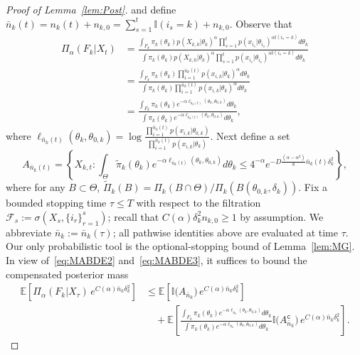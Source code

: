 \documentclass[10pt,a4paper]{amsart}
\def\bbE{\mathbb E}
\def\ind{\mathbb{I}}
\begin{document}
\begin{proof}[Proof of Lemma~\ref{lem:Post}]
 and define $\bar n_k(t)=n_k(t)+n_{k,0} =\sum_{s=1}^{t}  \ind(i_s = k) + n_{k,0} $. Observe that 
\begin{align}
    \nonumber
    \Pi_{\alpha}(F_k|X_{t})&= \frac{\int_{F_k} \pi_k(\theta_k) p(X_{k,0}|\theta_{k})^{\alpha}\prod_{s=1}^{t} p(x_{i_s}|\theta_{i_s})^{\alpha \ind(i_s = k)} d\theta_k} {\int \pi_k(\theta_k) p(X_{k,0}|\theta_{k})^{\alpha}\prod_{s=1}^{t} p(x_{i_s} |\theta_{i_s})^{\alpha \ind(i_s = k)} d\theta_k }
        \\
        \nonumber
        &= \frac{\int_{F_k} \pi_k(\theta_k) \prod_{i=1}^{\bar n_k(t)} p(x_{i,k}|\theta_k)^{\alpha }d\theta_k} {\int \pi_k(\theta_k) \prod_{i=1}^{\bar n_k(t)} p(x_{i,k}|\theta_k)^{\alpha }d\theta_k }
        \\
        &= \frac{\int_{F_k} \pi_k(\theta_k) e^{-\alpha \ell_{\bar n_k(t)}(\theta_k,\theta_{0,k})}d\theta_k} {\int \pi_k(\theta_k) e^{-\alpha \ell_{\bar n_k(t)}(\theta_k,\theta_{0,k})}d\theta_k },
        \label{eq:MABDE3}
\end{align}
where $\ell_{\bar n_k(t)}(\theta_k,\theta_{0,k})= \log \frac{\prod_{i=1}^{\bar n_k(t)} p(x_{i,k}|\theta_{0,k})}{\prod_{i=1}^{\bar n_k(t)} p(x_{i,k}|\theta_k)}$.
Next define a set 
\[A_{\bar n_k(t)} = \left\{ X_{k,t}: \int_{\Theta} \tilde \pi_k(\theta_k) e^{-\alpha \ell_{\bar n_k(t)}(\theta_k,\theta_{0,k})}d\theta_k \leq 4^{-\alpha} e^{-D \frac{(\alpha-\alpha^2)}{8} \bar n_k(t)\delta_k^2}  \right\},\] where for any $B\subset \Theta$, $\tilde \Pi_k(B) = \Pi_k\left(B\cap \Theta\right)/\Pi_k\left(B\left(\theta_{0,k},\delta_k \right)\right)$.
Fix a bounded stopping time $\tau \leq T$ with respect to the filtration $\mathcal{F}_s := \sigma\left(X_s, \{i_r\}_{r=1}^s\right)$; recall that $C(\alpha)\delta_k^2 n_{k,0} \geq 1$ by assumption. We abbreviate $\bar n_k := \bar n_k(\tau)$; all pathwise identities above are evaluated at time $\tau$. Our only probabilistic tool is the optional-stopping bound of Lemma~\ref{lem:MG}. %
In view of~\eqref{eq:MABDE2} and~\eqref{eq:MABDE3}, it suffices to bound the compensated posterior mass
\begin{align}
     \bbE\left[\Pi_{\alpha}(F_k|X_{\tau})\, e^{C(\alpha) \bar n_k \delta_k^2}\right] &\leq \bbE\left[\ind\big(A_{\bar n_k}\big)\, e^{C(\alpha) \bar n_k \delta_k^2}\right] \nonumber
     \\
     &\quad + \bbE \left[  \frac{\int_{F_k} \pi_k(\theta_k) e^{-\alpha \ell_{\bar n_k}(\theta_k,\theta_{0,k})}d\theta_k} {\int \pi_k(\theta_k) e^{-\alpha \ell_{\bar n_k}(\theta_k,\theta_{0,k})}d\theta_k } \ind\big(A_{\bar n_k}^\mathtt{c}\big)\, e^{C(\alpha) \bar n_k \delta_k^2} \right].
    \label{eq:MABDE4}
\end{align}


\end{proof}
\end{document}
